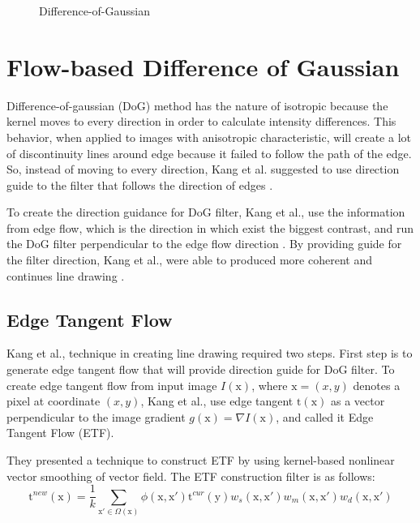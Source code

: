 \begin{figure}[H]
	\centering
	\caption{Difference-of-Gaussian}\label{fig:DoG}
\end{figure}

\section{Flow-based Difference of Gaussian} 
Difference-of-gaussian (DoG) method has the nature of isotropic because the kernel moves to every direction in order to calculate intensity differences. This behavior, when applied to images with anisotropic characteristic, will create a lot of discontinuity lines around edge because it failed to follow the path of the edge. So, instead of moving to every direction, Kang et al. suggested to use direction guide to the filter that follows the direction of edges \cite{kang07}.

To create the direction guidance for DoG filter, Kang et al., use the information from edge flow, which is the direction in which exist the biggest contrast, and run the DoG filter perpendicular to the edge flow direction \cite{kang07}. By providing guide for the filter direction, Kang et al., were able to produced more coherent and continues line drawing .

\subsection{Edge Tangent Flow}
Kang et al., technique in creating line drawing required two steps. First step is to generate edge tangent flow that will provide direction guide for DoG filter. To create edge tangent flow from input image $ I(\mbox{x}) $, where $ \mbox{x} = (x,y)$ denotes a pixel at coordinate $(x,y)$, Kang et al., use edge tangent $\mbox{t}(\mbox{x}) $ as a vector perpendicular to the image gradient $ g(\mbox{x}) = \nabla I(\mbox{x})$, and called it Edge Tangent Flow (ETF). 

They presented a technique to construct ETF by using kernel-based nonlinear vector smoothing of vector field. The ETF construction filter is as follows:
\begin{equation}
	\mbox{t} ^{new}(\mbox{x} ) = \frac{1}{k} \sum_{\mathrm{x}' \in \Omega (\mathrm{x})} \phi (\mbox{x},\mbox{x}') \mbox{t} ^{cur} (\mbox{y}) w_s(\mbox{x},\mbox{x}') w_m(\mbox{x},\mbox{x}') w_d(\mbox{x},\mbox{x}')
\end{equation}

